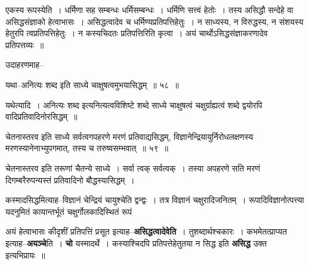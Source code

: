 \documentclass[article,12pt,a4paper]{memoir}
\begin{document}
	  \pstart एकस्य रूपस्येति । धर्मिणा सह सम्बन्धः धर्मिसम्बन्धः । धर्मिणि सत्त्वं हेतोः । तस्य असिद्धौ सन्देहे वा असिद्धसंज्ञाको हेत्वाभासः । असिद्धत्वादेव च धर्मिण्यप्रतिपत्तिहेतुः । न साध्यस्य, न विरुद्धस्य, न संशयस्य हेतुरपि त्वप्रतिपत्तिहेतुः । न कस्यचिदतः प्रतिपत्तिरिति कृत्वा । अयं चार्थोऽसिद्धसंज्ञाकरणादेव प्रतिपत्तव्यः ॥
	\pend
        

	  \pstart उदाहरणमाह--
	\pend
        
	  \bigskip
	  \begingroup
	

	  \pstart यथा--अनित्यः शब्द इति साध्ये चाक्षुषत्वमुभयासिद्धम् ॥ ५८ ॥
	\pend
      
	  \endgroup
	 

	  \pstart यथेत्यादि । अनित्यः शब्द इत्यनित्यत्वविशिष्टे शब्दे साध्ये चाक्षुषत्वं चक्षुर्ग्राह्यत्वं शब्दे द्वयोरपि वादिप्रतिवादिनोरसिद्धम् ॥
	\pend
        
	  \bigskip
	  \begingroup
	

	  \pstart चेतनास्तरव इति साध्ये सर्वत्वगपहरणे मरणं प्रतिवाद्यसिद्धम्, विज्ञानेन्द्रियायुर्निरोधलक्षणस्य मरणस्यानेनाभ्युपगमात्, तस्य च तरुष्वसम्भवात् ॥ ५९ ॥
	\pend
      
	  \endgroup
	 

	  \pstart चेतनास्तरव इति तरूणां चैतन्ये साध्ये । सर्वा त्वक् सर्वत्वक् । तस्या अपहरणे सति मरणं दिगम्बरैरुपन्यस्तं प्रतिवादिनो बौद्धस्यासिद्धम् ।
	\pend
        

	  \pstart कस्मादसिद्धमित्याह--विज्ञानं चेन्द्रियं चायुश्चेति द्वन्द्वः । तत्र विज्ञानं चक्षुरादिजनितम् । रूपादिविज्ञानोत्पत्त्या यदनुमितं कायान्तर्भूतं चक्षुर्गोलकादिस्थितं रूपं
	\pend
      
	  \endgroup
	

	  \pstart अयं हेत्वाभासः कीदृशीं प्रतिपत्तिं प्रसूत इत्याह--\textbf{असिद्धत्वादेवेति} । तुशब्दार्थश्चकारः । कभमेतत्प्राप्यत इत्याह--\textbf{अयञ्चे}ति । \textbf{चो} यस्मादर्थे । कस्याश्चिदपि प्रतिपत्तेहेतुतया न सिद्ध इति \textbf{असिद्ध} उक्त इत्यभिप्रायः ॥
	\pend
      
\end{document}
